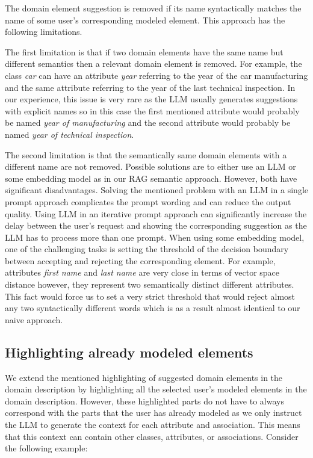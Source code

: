 The domain element suggestion is removed if its name syntactically matches the name of some user's corresponding modeled element. This approach has the following limitations.

The first limitation is that if two domain elements have the same name but different semantics then a relevant domain element is removed. For example, the class \textit{car} can have an attribute \textit{year} referring to the year of the car manufacturing and the same attribute referring to the year of the last technical inspection. In our experience, this issue is very rare as the LLM usually generates suggestions with explicit names so in this case the first mentioned attribute would probably be named \textit{year of manufacturing} and the second attribute would probably be named \textit{year of technical inspection}.

The second limitation is that the semantically same domain elements with a different name are not removed. Possible solutions are to either use an LLM or some embedding model as in our RAG semantic approach. However, both have significant disadvantages. Solving the mentioned problem with an LLM in a single prompt approach complicates the prompt wording and can reduce the output quality. Using LLM in an iterative prompt approach can significantly increase the delay between the user's request and showing the corresponding suggestion as the LLM has to process more than one prompt. When using some embedding model, one of the challenging tasks is setting the threshold of the decision boundary between accepting and rejecting the corresponding element. For example, attributes \textit{first name} and \textit{last name} are very close in terms of vector space distance however, they represent two semantically distinct different attributes. This fact would force us to set a very strict threshold that would reject almost any two syntactically different words which is as a result almost identical to our naive approach.


\subsection{Highlighting already modeled elements}
\label{sec:highlighting_already_modeled_elements}

We extend the mentioned highlighting of suggested domain elements in the domain description by highlighting all the selected user's modeled elements in the domain description. However, these highlighted parts do not have to always correspond with the parts that the user has already modeled as we only instruct the LLM to generate the context for each attribute and association. This means that this context can contain other classes, attributes, or associations. Consider the following example: \\

